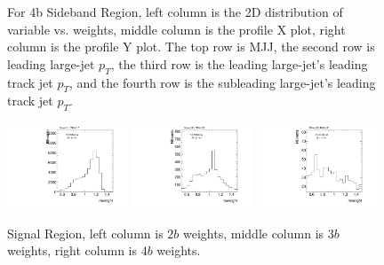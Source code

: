 \begin{figure}[htbp!]
\begin{center}
\caption{For 4b Sideband Region, left column is the 2D distribution of variable vs. weights, middle column is the profile X plot, right column is the profile Y plot. The top row is MJJ, the second row is leading large-\R jet $p_{T}$, the third row is the leading large-\R jet's leading track jet $p_{T}$, and the fourth row is the subleading large-\R jet's leading track jet $p_{T}$.}
\label{fig:app-reweight-dist-4b-SB}
\end{center}
\end{figure}


\begin{figure}[htbp!]
\begin{center}
\includegraphics[width=0.32\textwidth,angle=-90]{figures/boosted/AppendixReweight/Weights/2Trk_split_Signal_leadHCand_Pt_m_weight_projy.pdf}
\includegraphics[width=0.32\textwidth,angle=-90]{figures/boosted/AppendixReweight/Weights/3Trk_Signal_leadHCand_Pt_m_weight_projy.pdf}
\includegraphics[width=0.32\textwidth,angle=-90]{figures/boosted/AppendixReweight/Weights/4Trk_Signal_leadHCand_Pt_m_weight_projy.pdf}\\
\caption{Signal Region, left column is $2b$ weights, middle column is $3b$ weights, right column is $4b$ weights.}
\label{fig:app-reweight-dist-weights-SR}
\end{center}
\end{figure}

